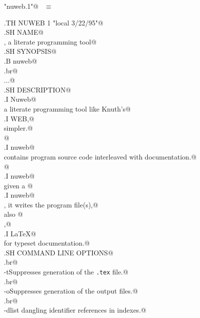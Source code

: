 \documentclass{report}
\begin{document}
\begin{flushleft} \small \label{scrap262}
\verb@"nuweb.1"@\nobreak\ {\footnotesize {} }$\equiv$
\vspace{-1ex}
\begin{list}{}{} \item
\mbox{}\verb@.TH NUWEB 1 "local 3/22/95"@\\
\mbox{}\verb@.SH NAME@\\
\mbox{}\verb@Nuweb, a literate programming tool@\\
\mbox{}\verb@.SH SYNOPSIS@\\
\mbox{}\verb@.B nuweb@\\
\mbox{}\verb@.br@\\
\mbox{}\verb@\fBnuweb\fP [options] [file] ...@\\
\mbox{}\verb@.SH DESCRIPTION@\\
\mbox{}\verb@.I Nuweb@\\
\mbox{}\verb@is a literate programming tool like Knuth's@\\
\mbox{}\verb@.I WEB,@\\
\mbox{}\verb@only simpler.@\\
\mbox{}\verb@A @\\
\mbox{}\verb@.I nuweb@\\
\mbox{}\verb@file contains program source code interleaved with documentation.@\\
\mbox{}\verb@When @\\
\mbox{}\verb@.I nuweb@\\
\mbox{}\verb@is given a @\\
\mbox{}\verb@.I nuweb@\\
\mbox{}\verb@file, it writes the program file(s),@\\
\mbox{}\verb@and also @\\
\mbox{}\verb@produces,@\\
\mbox{}\verb@.I LaTeX@\\
\mbox{}\verb@source for typeset documentation.@\\
\mbox{}\verb@.SH COMMAND LINE OPTIONS@\\
\mbox{}\verb@.br@\\
\mbox{}\verb@\fB-t\fP Suppresses generation of the {\tt .tex} file.@\\
\mbox{}\verb@.br@\\
\mbox{}\verb@\fB-o\fP Suppresses generation of the output files.@\\
\mbox{}\verb@.br@\\
\mbox{}\verb@\fB-d\fP list dangling identifier references in indexes.@\\

\end{list}
\end{flushleft}
\end{document}
